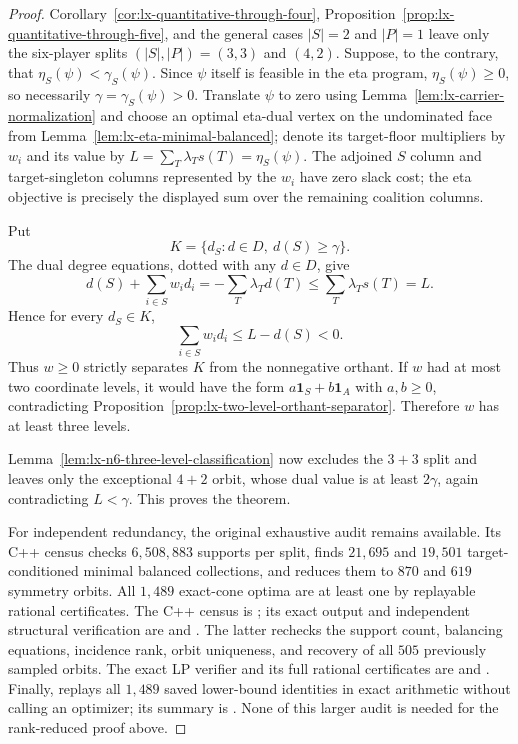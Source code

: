 \begin{proof}
Corollary~\ref{cor:lx-quantitative-through-four},
Proposition~\ref{prop:lx-quantitative-through-five}, and the general cases
$|S|=2$ and $|P|=1$ leave only the six-player splits
$(|S|,|P|)=(3,3)$ and $(4,2)$.  Suppose, to the contrary, that
$\eta_S(\psi)<\gamma_S(\psi)$.  Since $\psi$ itself is feasible in the eta
program, $\eta_S(\psi)\geq0$, so necessarily
$\gamma=\gamma_S(\psi)>0$.  Translate $\psi$ to zero using
Lemma~\ref{lem:lx-carrier-normalization} and choose an optimal eta-dual vertex on the undominated face from
Lemma~\ref{lem:lx-eta-minimal-balanced}; denote its target-floor multipliers
by $w_i$ and its value by $L=\sum_T\lambda_Ts(T)=\eta_S(\psi)$.
The adjoined $S$ column and target-singleton columns represented by the $w_i$
have zero slack cost; the eta objective is precisely the displayed sum over
the remaining coalition columns.

Put
\[
 K=\{d_S:d\in D,\ d(S)\geq\gamma\}.
\]
The dual degree equations, dotted with any $d\in D$, give
\[
 d(S)+\sum_{i\in S}w_i d_i
 =-\sum_T\lambda_Td(T)
 \leq\sum_T\lambda_Ts(T)=L.
\]
Hence for every $d_S\in K$,
\[
 \sum_{i\in S}w_i d_i\leq L-d(S)<0.
\]
Thus $w\geq0$ strictly separates $K$ from the nonnegative orthant.  If $w$
had at most two coordinate levels, it would have the form
$a\mathbf1_S+b\mathbf1_A$ with $a,b\geq0$, contradicting
Proposition~\ref{prop:lx-two-level-orthant-separator}.  Therefore $w$ has at
least three levels.

Lemma~\ref{lem:lx-n6-three-level-classification} now excludes the $3+3$
split and leaves only the exceptional $4+2$ orbit, whose dual value is at
least $2\gamma$, again contradicting $L<\gamma$.  This proves the theorem.

For independent redundancy, the original exhaustive audit remains available.
Its C++ census checks $6{,}508{,}883$ supports per split, finds $21{,}695$ and
$19{,}501$ target-conditioned minimal balanced collections, and reduces them
to $870$ and $619$ symmetry orbits.  All $1{,}489$ exact-cone optima are at
least one by replayable rational certificates.  The C++ census is
; its exact output and independent
structural verification are
 and
.  The latter
rechecks the support count, balancing equations, incidence rank, orbit
uniqueness, and recovery of all $505$ previously sampled orbits.  The exact
LP verifier and its full rational certificates are
 and
.  Finally,
 replays all $1{,}489$ saved
lower-bound identities in exact arithmetic without calling an optimizer; its
summary is .  None of
this larger audit is needed for the rank-reduced proof above.
\end{proof}

